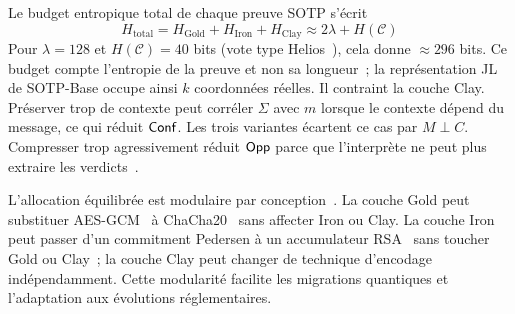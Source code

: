 \begin{sloppypar}
Le budget entropique total de chaque preuve SOTP s'\'ecrit
\begin{equation}
H_{\text{total}} = H_{\text{Gold}} + H_{\text{Iron}} + H_{\text{Clay}}
  \approx 2\lambda + H(\mathcal{C})
\label{eq:entropy_budget}
\end{equation}
Pour $\lambda = 128$ et $H(\mathcal{C}) = 40$ bits (vote type Helios~\cite{Adida08}), cela donne
$\approx 296$ bits. Ce budget compte l'entropie de la preuve et non sa longueur~; la
repr\'esentation JL de SOTP-Base occupe ainsi $k$ coordonn\'ees r\'eelles. Il contraint la couche Clay. Pr\'eserver trop de contexte
peut corr\'eler $\Sigma$ avec $m$ lorsque le contexte d\'epend du message, ce qui r\'eduit $\mathsf{Conf}$. Les trois variantes \'ecartent ce cas par $M \perp C$. Compresser trop agressivement
r\'eduit $\mathsf{Opp}$ parce que l'interpr\`ete ne peut plus extraire les verdicts~\cite{Smith09,Alvim12}.

L'allocation \'equilibr\'ee est modulaire par conception~\cite{canetti2001,Goldreich02}. La couche Gold peut substituer
AES-GCM~\cite{AES01} \`a ChaCha20~\cite{ChaCha20} sans affecter Iron ou Clay. La couche Iron peut passer d'un
commitment Pedersen \`a un accumulateur RSA~\cite{CamenischLysyanskaya02} sans toucher Gold ou Clay~; la couche Clay
peut changer de technique d'encodage ind\'ependamment. Cette modularit\'e facilite les
migrations quantiques et l'adaptation aux \'evolutions r\'eglementaires.
\end{sloppypar}

